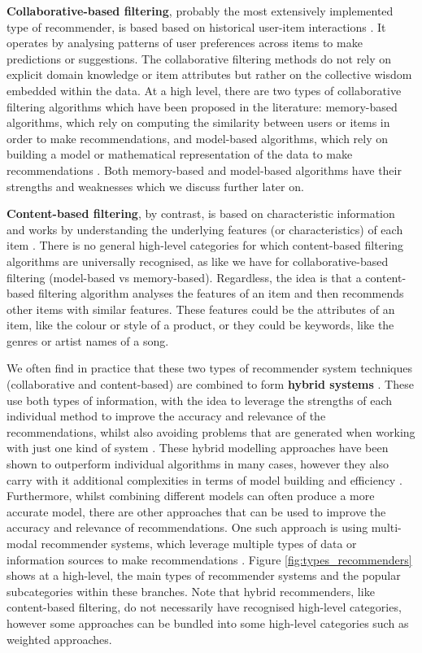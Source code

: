 \textbf{Collaborative-based filtering}, probably the most extensively implemented type of recommender, is based based on historical user-item interactions \cite{thorat2015survey}. It operates by analysing patterns of user preferences across items to make predictions or suggestions. The collaborative filtering methods do not rely on explicit domain knowledge or item attributes but rather on the collective wisdom embedded within the data. At a high level, there are two types of collaborative filtering algorithms which have been proposed in the literature: memory-based algorithms, which rely on computing the similarity between users or items in order to make recommendations, and model-based algorithms, which rely on building a model or mathematical representation of the data to make recommendations \cite{thorat2015survey}. Both memory-based and model-based algorithms have their strengths and weaknesses which we discuss further later on. 

\textbf{Content-based filtering}, by contrast, is based on characteristic information and works by understanding the underlying features (or characteristics) of each item \cite{thorat2015survey}. There is no general high-level categories for which content-based filtering algorithms are universally recognised, as like we have for collaborative-based filtering (model-based vs memory-based). Regardless, the idea is that a content-based filtering algorithm analyses the features of an item and then recommends other items with similar features. These features could be the attributes of an item, like the colour or style of a product, or they could be keywords, like the genres or artist names of a song. 

We often find in practice that these two types of recommender system techniques (collaborative and content-based) are combined to form \textbf{hybrid systems} \cite{thorat2015survey}. These use both types of information, with the idea to leverage the strengths of each individual method to improve the accuracy and relevance of the recommendations, whilst also avoiding problems that are generated when working with just one kind of system \cite{thorat2015survey}. These hybrid modelling approaches have been shown to outperform individual algorithms in many cases, however they also carry with it additional complexities in terms of model building and efficiency \cite{ccano2017hybrid}. Furthermore, whilst combining different models can often produce a more accurate model, there are other approaches that can be used to improve the accuracy and relevance of recommendations. One such approach is using multi-modal recommender systems, which leverage multiple types of data or information sources to make recommendations \cite{ccano2017hybrid}. Figure \ref{fig:types_recommenders} shows at a high-level, the main types of recommender systems and the popular subcategories within these branches. Note that hybrid recommenders, like content-based filtering, do not necessarily have recognised high-level categories, however some approaches can be bundled into some high-level categories such as weighted approaches.

